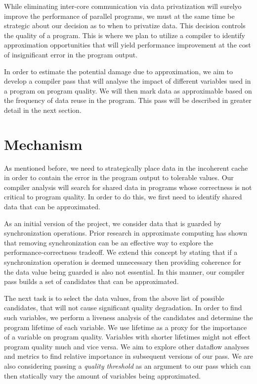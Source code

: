 \documentclass[12pt,conference]{IEEEtran}
\begin{document}
While eliminating inter-core communication via data privatization
will surelyo improve the performance of parallel programs, we must at the same time
be strategic about our decision as to when to privatize data. This 
decision controls the quality of a program. This is where we plan to 
utilize a compiler to identify approximation opportunities that will 
yield performance improvement at the cost of insignificant error in the
program output.

In order to estimate the potential damage due to approximation, we aim
to develop a compiler pass that will analyse the impact of different 
variables used in a program on program quality. We will then mark data as approximable based 
on the frequency of data reuse in the program. This pass will be 
described in greater detail in the next section.

\section{Mechanism}

As mentioned before, we need to strategically place data
in the incoherent cache in order to contain the error in the 
program output to tolerable values. Our compiler analysis will search
for shared data in programs whose correctness is not critical to 
program quality. In order to do this, we first need to identify 
shared data that can be approximated. 

As an initial version of the project, we consider data 
that is guarded by synchronization operations. Prior research 
in approximate computing has shown that removing synchronization 
can be an effective way to explore the performance-correctness 
tradeoff. We extend this concept by stating that if a
synchronization operation is deemed unnecessary then 
providing coherence for the data value being guarded is also 
not essential. In this manner, our compiler pass builds a 
set of candidates that can be approximated. 

The next task is to select the data values, from the 
above list of possible candidates, that will not cause 
significant quality degradation. In order to find such
variables, we perform a liveness analysis of the candidates 
and determine the program lifetime of each variable. We use
lifetime as a proxy for the importance of a variable on program
quality. Variables with shorter lifetimes might not effect program 
quality much and vice versa. We aim to explore other dataflow 
analyses and metrics to find relative importance in subsequent
versions of our pass. We are also considering passing a 
\emph{quality threshold} as an argument to our pass which can then statically vary the
amount of variables being approximated. 
\end{document}
